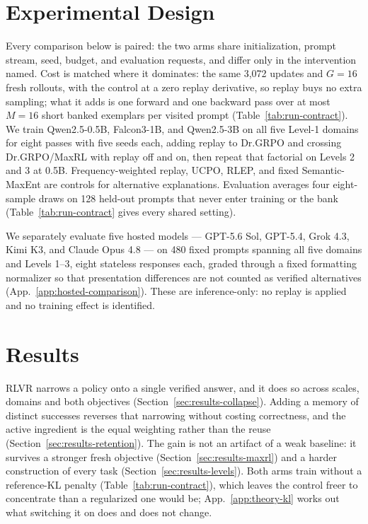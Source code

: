 \documentclass{article}
\newcommand{\1}{\mathbf 1}
\theoremstyle{remark}
\theoremstyle{definition}
\theoremstyle{plain}
\begin{document}
\section{Experimental Design}
\label{sec:experiments}
\label{sec:shared-protocol}

Every comparison below is paired: the two arms share initialization, prompt
stream, seed, budget, and evaluation requests, and differ only in the
intervention named. Cost is matched where it dominates: the same 3,072
updates and $G=16$ fresh rollouts, with the control at a zero replay derivative,
so replay buys no extra sampling; what it adds is one forward and one backward
pass over at most $M=16$ short banked exemplars per visited prompt
(Table~\ref{tab:run-contract}).
\label{sec:retention-design}%
\label{sec:factorial-design}%
We train Qwen2.5-0.5B, Falcon3-1B, and Qwen2.5-3B on all five Level-1 domains
for eight passes with five seeds each, adding replay to Dr.GRPO and crossing
Dr.GRPO/MaxRL with replay off and on, then repeat that factorial on Levels 2
and 3 at 0.5B. Frequency-weighted replay, UCPO, RLEP, and fixed Semantic-MaxEnt are
controls for alternative explanations. Evaluation averages four eight-sample
draws on 128 held-out prompts that never enter training or the bank
(Table~\ref{tab:run-contract} gives every shared setting).

We separately evaluate five hosted models --- GPT-5.6 Sol, GPT-5.4, Grok 4.3,
Kimi K3, and Claude Opus 4.8 --- on 480 fixed prompts spanning all five domains
and Levels 1--3, eight stateless responses each, graded through a fixed
formatting normalizer so that presentation differences are not counted as
verified alternatives (App.~\ref{app:hosted-comparison}). These are
inference-only: no replay is applied and no training effect is identified.

\section{Results}
\label{sec:results}

RLVR narrows a policy onto a single verified
answer, and it does so across scales, domains and both objectives
(Section~\ref{sec:results-collapse}). Adding a memory of distinct successes
reverses that narrowing without costing correctness, and the active ingredient
is the equal weighting rather than the reuse
(Section~\ref{sec:results-retention}). The gain is not an artifact of a weak
baseline: it survives a stronger fresh objective
(Section~\ref{sec:results-maxrl}) and a harder construction of every task
(Section~\ref{sec:results-levels}). Both arms train without a reference-KL
penalty (Table~\ref{tab:run-contract}), which leaves the control freer to
concentrate than a regularized one would be; App.~\ref{app:theory-kl} works
out what switching it on does and does not change.
\end{document}
